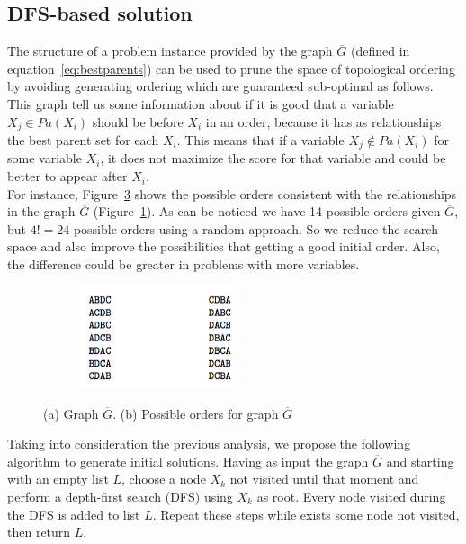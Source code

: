 \subsection{DFS-based solution}
\label{subsec:dfsapproach}
	The structure of a problem instance provided by the graph $\overline G$ (defined in equation~\ref{eq:bestparents}) can be used to prune the space of topological ordering by avoiding generating ordering which are guaranteed sub-optimal as follows. This graph tell us some information about if it is good that a variable $X_j \in {Pa}( X_i )$ should be before $X_i$ in an order, because it has as relationships the best parent set for each $X_i$. This means that if a variable $X_j \not \in {Pa}( X_i )$ for some variable $X_i$, it does not maximize the score for that variable and could be better to appear after $X_i$.\\
	For instance, Figure~\ref{fig:dfsorders} shows the possible orders consistent with the relationships in the graph $\overline G$ (Figure~\ref{fig:example}). As can be noticed we have 14 possible orders given $\overline{G}$, but $4! = 24$ possible orders using a random approach. So we reduce the search space and also improve the possibilities that getting a good initial order. Also, the difference could be greater in problems with more variables.
	\begin{figure}[H]
	 	\centering
	 	\begin{subfigure}{.48\textwidth}
	 		\centering
			
			\caption{}
			\label{fig:example}
	 	\end{subfigure}
	 	\begin{subfigure}{.48\textwidth}
	 		\centering
			\includegraphics[height=3cm]{images/dfsorders}
			\caption{}
			\label{fig:dfsorders}
	 	\end{subfigure}
		\caption{(a) Graph $\overline{G}$. (b) Possible orders for graph $\overline G$}
	\end{figure}
	Taking into consideration the previous analysis, we propose the following algorithm to generate initial solutions. Having as input the graph $\overline G$ and starting with an empty list $L$, choose a node $X_k$ not visited until that moment and perform a depth-first search (DFS) using $X_k$ as root. Every node visited during the DFS is added to list $L$. Repeat these steps while exists some node not visited, then return $L$.
	
